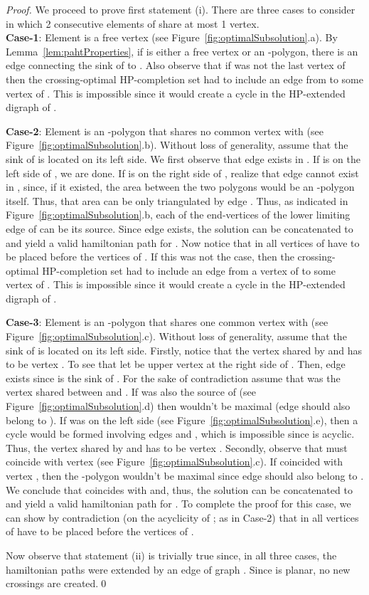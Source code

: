 \documentclass{myllncs-mixalis}
\begin{document}
\begin{proof}
We proceed to prove first statement (i). There are three cases to
consider in which 2 consecutive elements of
 share at most 1 vertex.\\
\textbf{Case-1}: Element  is a free vertex (see
Figure~\ref{fig:optimalSubsolution}.a). By
Lemma~\ref{lem:pahtProperties}, if  is either a free vertex or
an -polygon, there is an edge connecting the sink of  to
. Also observe that if  was not the last vertex of
 then the crossing-optimal HP-completion set had to
include an edge from  to some vertex of . This is impossible
since it would create a cycle in the HP-extended digraph of
.

\textbf{Case-2}: Element  is an -polygon that shares no
common vertex with  (see
Figure~\ref{fig:optimalSubsolution}.b). Without loss of generality,
assume that the sink of  is located on its left side. We first
observe that edge  exists in . If  is on
the left side of , we are done. If  is on the right side
of , realize that edge  cannot exist in , since, if it
existed, the area between the two polygons would be an -polygon
itself. Thus, that area can be only triangulated by edge . Thus, as indicated in
Figure~\ref{fig:optimalSubsolution}.b, each of the end-vertices of
the lower limiting edge of  can be its source. Since edge
 exists, the solution  can be
concatenated to  and yield a valid hamiltonian path for
. Now notice that in  all vertices of 
have to be placed before the vertices of . If this was not
the case, then the crossing-optimal HP-completion set had to include
an edge from a vertex  of  to some vertex  of .
This is impossible since it would create a cycle in the HP-extended
digraph of .

\textbf{Case-3}: Element  is an -polygon that shares
one common vertex with  (see
Figure~\ref{fig:optimalSubsolution}.c). Without loss of generality,
assume that the sink  of  is located on its left side.
Firstly, notice that the  vertex shared by  and  has
to be vertex . To see that let  be upper vertex at the right
side of . Then, edge  exists since  is the sink
of . For the sake of contradiction assume that  was the
vertex shared between  and . If  was also the
source of  (see Figure~\ref{fig:optimalSubsolution}.d) then
 wouldn't be maximal (edge  should also belong to
). If   was on the left side (see
Figure~\ref{fig:optimalSubsolution}.e), then a cycle would be formed
involving edges  and , which is
impossible since  is acyclic. Thus, the vertex shared by 
and  has to be vertex . Secondly, observe that 
must coincide with vertex  (see
Figure~\ref{fig:optimalSubsolution}.c). If  coincided with
vertex , then the -polygon  wouldn't be maximal since
edge  should also belong to . We conclude that 
coincides with  and, thus, the solution  can be
concatenated to  and yield a valid hamiltonian path for
. To complete the proof for this case, we can show by
contradiction (on the acyclicity of ; as in Case-2)  that in
 all vertices of  have to be placed before the
vertices of .

Now observe that statement (ii) is trivially true since, in all
three cases, the hamiltonian paths were extended by an edge of graph
. Since  is planar, no new crossings are created.\qed
\end{proof}
\end{document}
